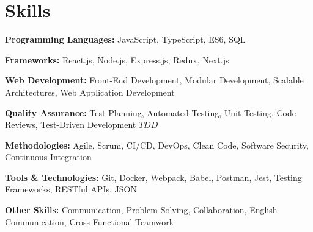\section{Skills}
\vspace{2pt}
\resumeSubHeadingListStart
\small{\item{

                  \textbf{Programming Languages:} JavaScript, TypeScript, ES6, SQL \\ \vspace{3pt}

                  \textbf{Frameworks:} React.js, Node.js, Express.js, Redux, Next.js \\ \vspace{3pt}

                  \textbf{Web Development:} Front-End Development, Modular Development, Scalable Architectures, Web Application Development \\ \vspace{3pt}



                  \textbf{Quality Assurance:} Test Planning, Automated Testing, Unit Testing, Code Reviews, Test-Driven Development \(TDD\) \\ \vspace{3pt}

                  \textbf{Methodologies:} Agile, Scrum, CI/CD, DevOps, Clean Code, Software Security, Continuous Integration \\ \vspace{3pt}

                  \textbf{Tools \& Technologies:} Git, Docker, Webpack, Babel, Postman, Jest, Testing Frameworks, RESTful APIs, JSON  \\ \vspace{3pt}


                  \textbf{Other Skills:} Communication, Problem-Solving, Collaboration, English Communication, Cross-Functional Teamwork
            }}
\resumeSubHeadingListEnd
